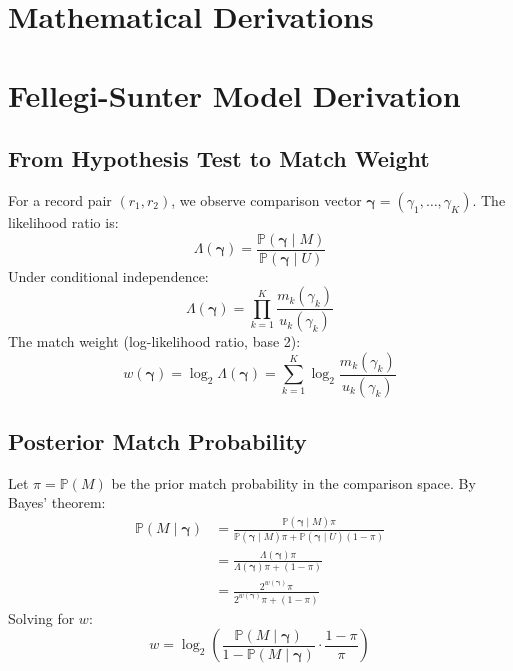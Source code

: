 \section{Mathematical Derivations}
\label{annex:math_derivations}

\section{Fellegi-Sunter Model Derivation}
\label{annex:fs_derivation}

\subsection{From Hypothesis Test to Match Weight}
For a record pair $(r_1, r_2)$, we observe comparison vector $\boldsymbol{\gamma} = (\gamma_1, \dots, \gamma_K)$.
The likelihood ratio is:
\begin{equation}
	\Lambda(\boldsymbol{\gamma}) = \frac{\mathbb{P}(\boldsymbol{\gamma} \mid M)}{\mathbb{P}(\boldsymbol{\gamma} \mid U)}
\end{equation}
Under conditional independence:
\begin{equation}
	\Lambda(\boldsymbol{\gamma}) = \prod_{k=1}^K \frac{m_k(\gamma_k)}{u_k(\gamma_k)}
\end{equation}
The match weight (log-likelihood ratio, base 2):
\begin{equation}
	w(\boldsymbol{\gamma}) = \log_2 \Lambda(\boldsymbol{\gamma}) = \sum_{k=1}^K \log_2 \frac{m_k(\gamma_k)}{u_k(\gamma_k)}
\end{equation}

\subsection{Posterior Match Probability}
Let $\pi = \mathbb{P}(M)$ be the prior match probability in the comparison space.
By Bayes' theorem:
\begin{align}
	\mathbb{P}(M \mid \boldsymbol{\gamma}) & = \frac{\mathbb{P}(\boldsymbol{\gamma} \mid M) \pi}{\mathbb{P}(\boldsymbol{\gamma} \mid M) \pi + \mathbb{P}(\boldsymbol{\gamma} \mid U) (1-\pi)} \\
	                                       & = \frac{\Lambda(\boldsymbol{\gamma}) \pi}{\Lambda(\boldsymbol{\gamma}) \pi + (1-\pi)}                                                            \\
	                                       & = \frac{2^{w(\boldsymbol{\gamma})} \pi}{2^{w(\boldsymbol{\gamma})} \pi + (1-\pi)}
\end{align}
Solving for $w$:
\begin{equation}
	w = \log_2 \left( \frac{\mathbb{P}(M \mid \boldsymbol{\gamma})}{1 - \mathbb{P}(M \mid \boldsymbol{\gamma})} \cdot \frac{1-\pi}{\pi} \right)
\end{equation}

